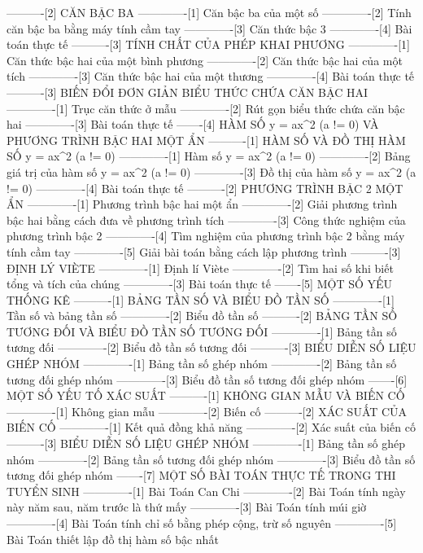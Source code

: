 ----------[2] CĂN BẬC BA
-------------[1] Căn bậc ba của một số
-------------[2] Tính căn bậc ba bằng máy tính cầm tay
-------------[3] Căn thức bậc 3
-------------[4] Bài toán thực tế
----------[3] TÍNH CHẤT CỦA PHÉP KHAI PHƯƠNG
-------------[1] Căn thức bậc hai của một bình phương
-------------[2] Căn thức bậc hai của một tích
-------------[3] Căn thức bậc hai của một thương
-------------[4] Bài toán thực tế
----------[3] BIẾN ĐỔI ĐƠN GIẢN BIỂU THỨC CHỨA CĂN BẬC HAI
-------------[1] Trục căn thức ở mẫu
-------------[2] Rút gọn biểu thức chứa căn bậc hai
-------------[3] Bài toán thực tế
-------[4] HÀM SỐ y = ax^2 (a != 0) VÀ PHƯƠNG TRÌNH BẬC HAI MỘT ẨN
----------[1] HÀM SỐ VÀ ĐỒ THỊ HÀM SỐ y = ax^2 (a != 0)
-------------[1] Hàm số y = ax^2 (a != 0)
-------------[2] Bảng giá trị của hàm số y = ax^2 (a != 0)
-------------[3] Đồ thị của hàm số y = ax^2 (a != 0)
-------------[4] Bài toán thực tế
----------[2] PHƯƠNG TRÌNH BẬC 2 MỘT ẨN
-------------[1] Phương trình bậc hai một ẩn
-------------[2] Giải phương trình bậc hai bằng cách đưa về phương trình tích
-------------[3] Công thức nghiệm của phương trình bậc 2
-------------[4] Tìm nghiệm của phương trình bậc 2 bằng máy tính cầm tay
-------------[5] Giải bài toán bằng cách lập phương trình
----------[3] ĐỊNH LÝ VIÈTE
-------------[1] Định lí Viète
-------------[2] Tìm hai số khi biết tổng và tích của chúng
-------------[3] Bài toán thực tế
-------[5] MỘT SỐ YẾU THỐNG KÊ
----------[1] BẢNG TẦN SỐ VÀ BIỂU ĐỒ TẦN SỐ
-------------[1] Tần số và bảng tần số
-------------[2] Biểu đồ tần số
----------[2] BẢNG TẦN SỐ TƯƠNG ĐỐI VÀ BIỂU ĐỒ TẦN SỐ TƯƠNG ĐỐI
-------------[1] Bảng tần số tương đối
-------------[2] Biểu đồ tần số tương đối
----------[3] BIỂU DIỄN SỐ LIỆU GHÉP NHÓM
-------------[1] Bảng tần số ghép nhóm
-------------[2] Bảng tần số tương đối ghép nhóm
-------------[3] Biểu đồ tần số tương đối ghép nhóm
-------[6] MỘT SỐ YẾU TỐ XÁC SUẤT
----------[1] KHÔNG GIAN MẪU VÀ BIẾN CỐ
-------------[1] Không gian mẫu
-------------[2] Biến cố
----------[2] XÁC SUẤT CỦA BIẾN CỐ
-------------[1] Kết quả đồng khả năng
-------------[2] Xác suất của biến cố
----------[3] BIỂU DIỄN SỐ LIỆU GHÉP NHÓM
-------------[1] Bảng tần số ghép nhóm
-------------[2] Bảng tần số tương đối ghép nhóm
-------------[3] Biểu đồ tần số tương đối ghép nhóm
-------[7] MỘT SỐ BÀI TOÁN THỰC TẾ TRONG THI TUYỂN SINH
-------------[1] Bài Toán Can Chi
-------------[2] Bài Toán tính ngày này năm sau, năm trước là thứ mấy
-------------[3] Bài Toán tính múi giờ
-------------[4] Bài Toán tính chỉ số bằng phép cộng, trừ số nguyên
-------------[5] Bài Toán thiết lập đồ thị hàm số bậc nhất
